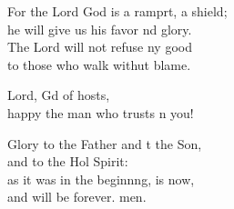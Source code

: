 \begin{psalmverse}
\begin{patverse}
For the Lord God is a ramprt, a shield;\Med\\
he will give us his favor nd glory.\\
The Lord will not refuse ny good\Med\\
to those who walk withut blame.

Lord, Gd of hosts,\Med\\
happy the man who trusts \pointup{\i}n you!

Glory to the Father and t the Son,\Med\\
and to the Hol Spirit:\\
as it was in the beginn\pointup{\i}ng, is now,\Med\\
and will be forever. men. 
  \end{patverse}
\end{psalmverse}
